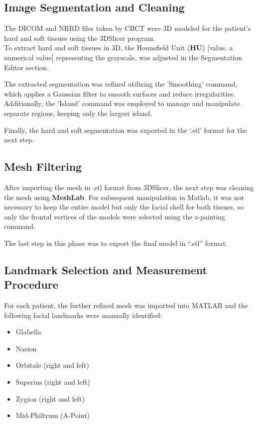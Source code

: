 \documentclass[journal,article,submit,pdftex,moreauthors]{Definitions/mdpi}
\begin{document}
\subsection{Image Segmentation and Cleaning}

The DICOM and NRRD files taken by CBCT were 3D modeled for the patient’s hard and soft tissues using the 3DSlicer program.
\\To extract hard and soft tissues in 3D, the Hounsfield Unit (\textbf{HU}) [value, a numerical value] representing the grayscale, was adjusted in the Segmentation Editor section. 

The extracted segmentation was refined utilizing the 'Smoothing' command, which applies a Gaussian filter to smooth surfaces and reduce irregularities. Additionally, the 'Island' command was employed to manage and manipulate separate regions, keeping only the largest island.


Finally, the hard and soft segmentation was exported in the ‘.stl’ format for the next step.


\subsection{Mesh Filtering}

After importing the mesh in .stl format from 3DSlicer, the next step was cleaning the mesh using \textbf{MeshLab}.
For subsequent manipulation in Matlab, it was not necessary to keep the entire model but only the facial shell for both tissues, so only the frontal vertices of the models were selected using the z-painting command.

The last step in this phase was to export the final model in “.stl” format.

\subsection{Landmark Selection and Measurement Procedure}
For each patient, the further refined mesh was imported into MATLAB and the following facial landmarks were manually identified:
\begin{itemize}
    \item Glabella
    \item Nasion
    \item Orbitale (right and left)
    \item Superius (right and left)
    \item Zygion (right and left)
    \item Mid-Philtrum (A-Point)
\end{itemize}
\end{document}

